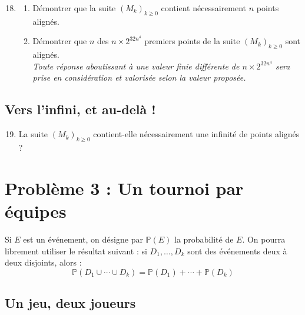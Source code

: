 \documentclass[landscape,twocolumn,leqno,a4paper,10pt]{report} %
\newcommand\n{\noindent}
\renewcommand{\geq}{\geqslant}
\begin{document}
\begin{enumerate}\setcounter{enumi}{17}	
	\item \begin{enumerate}
		\item Démontrer que la suite $\left(M_{k}\right)_{k \geq 0}$ contient nécessairement $n$ points alignés.
		\item Démontrer que $n$ des $n \times 2^{32 n^{4}}$ premiers points de la suite $\left(M_{k}\right)_{k \geq 0}$ sont alignés.\\
		\textit{Toute réponse aboutissant à une valeur finie différente de $n \times 2^{32 n^{4}}$ sera prise en considération et valorisée selon la valeur proposée.}
	\end{enumerate}
\end{enumerate}


\subsection{Vers l'infini, et au-delà !}

\begin{enumerate}\setcounter{enumi}{18}
	\item La suite $\left(M_{k}\right)_{k \geq 0}$ contient-elle nécessairement une infinité de points alignés ?
\end{enumerate}

\newpage

\section{Problème 3 : Un tournoi par équipes}

\n Si $E$ est un événement, on désigne par $\mathbb{P}(E)$ la probabilité de $E$. On pourra librement utiliser le résultat suivant : si $D_{1}, \ldots, D_{k}$ sont des événements deux à deux disjoints, alors :
$$\mathbb{P}\left(D_{1} \cup \cdots \cup D_{k}\right)=\mathbb{P}\left(D_{1}\right)+\cdots+\mathbb{P}\left(D_{k}\right) $$

\subsection{Un jeu, deux joueurs}
\end{document}
